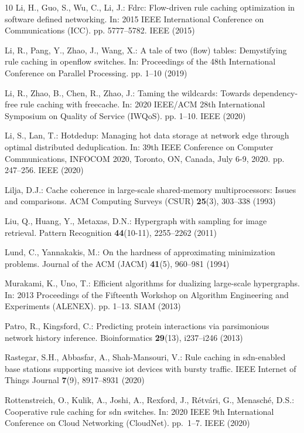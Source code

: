 \documentclass[11pt]{article}
\begin{document}
\begin{thebibliography}{10}
Li, H., Guo, S., Wu, C., Li, J.: Fdrc: Flow-driven rule caching optimization in
  software defined networking. In: 2015 IEEE International Conference on
  Communications (ICC). pp. 5777--5782. IEEE (2015)

Li, R., Pang, Y., Zhao, J., Wang, X.: A tale of two (flow) tables: Demystifying
  rule caching in openflow switches. In: Proceedings of the 48th International
  Conference on Parallel Processing. pp. 1--10 (2019)

Li, R., Zhao, B., Chen, R., Zhao, J.: Taming the wildcards: Towards
  dependency-free rule caching with freecache. In: 2020 IEEE/ACM 28th
  International Symposium on Quality of Service (IWQoS). pp. 1--10. IEEE (2020)

Li, S., Lan, T.: Hotdedup: Managing hot data storage at network edge through
  optimal distributed deduplication. In: 39th {IEEE} Conference on Computer
  Communications, {INFOCOM} 2020, Toronto, ON, Canada, July 6-9, 2020. pp.
  247--256. {IEEE} (2020)

Lilja, D.J.: Cache coherence in large-scale shared-memory multiprocessors:
  Issues and comparisons. ACM Computing Surveys (CSUR)  \textbf{25}(3),
  303--338 (1993)

Liu, Q., Huang, Y., Metaxas, D.N.: Hypergraph with sampling for image
  retrieval. Pattern Recognition  \textbf{44}(10-11),  2255--2262 (2011)

Lund, C., Yannakakis, M.: On the hardness of approximating minimization
  problems. Journal of the ACM (JACM)  \textbf{41}(5),  960--981 (1994)

Murakami, K., Uno, T.: Efficient algorithms for dualizing large-scale
  hypergraphs. In: 2013 Proceedings of the Fifteenth Workshop on Algorithm
  Engineering and Experiments (ALENEX). pp. 1--13. SIAM (2013)

Patro, R., Kingsford, C.: Predicting protein interactions via parsimonious
  network history inference. Bioinformatics  \textbf{29}(13),  i237--i246
  (2013)

Rastegar, S.H., Abbasfar, A., Shah-Mansouri, V.: Rule caching in sdn-enabled
  base stations supporting massive iot devices with bursty traffic. IEEE
  Internet of Things Journal  \textbf{7}(9),  8917--8931 (2020)

Rottenstreich, O., Kulik, A., Joshi, A., Rexford, J., R{\'e}tv{\'a}ri, G.,
  Menasch{\'e}, D.S.: Cooperative rule caching for sdn switches. In: 2020 IEEE
  9th International Conference on Cloud Networking (CloudNet). pp.~1--7. IEEE
  (2020)


\end{thebibliography}
\end{document}
